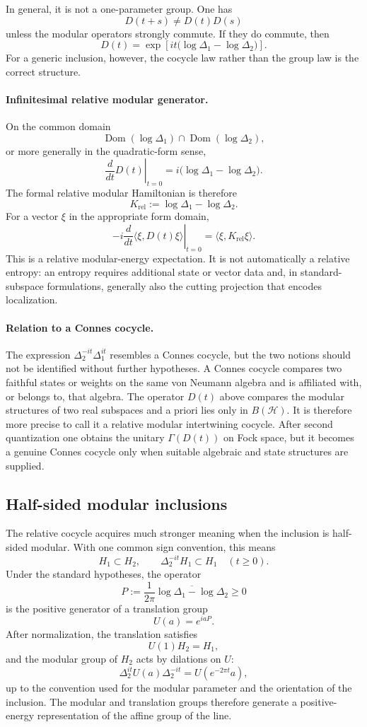 \documentclass[a4paper,11pt]{article}
\theoremstyle{definition}
\newcommand{\cH}{\mathcal{H}}
\newcommand{\Dom}{\operatorname{Dom}}
\begin{document}
In general, it is not a one-parameter group.  One has
\[
 D(t+s)\neq D(t)D(s)
\]
unless the modular operators strongly commute.  If they do commute, then
\[
 D(t)
 =\exp\!\left[it\bigl(\log\Delta_1-\log\Delta_2\bigr)\right].
\]
For a generic inclusion, however, the cocycle law rather than the group
law is the correct structure.

\paragraph{Infinitesimal relative modular generator.}
On the common domain
\[
\Dom(\log\Delta_1)\cap\Dom(\log\Delta_2),
\]
or more generally in the quadratic-form sense,
\[
\boxed{
   \left.\frac{d}{dt}D(t)\right|_{t=0}
   =i\bigl(\log\Delta_1-\log\Delta_2\bigr).
}
\]
The formal relative modular Hamiltonian is therefore
\[
K_{\mathrm{rel}}
   :=\log\Delta_1-\log\Delta_2.
\]
For a vector $\xi$ in the appropriate form domain,
\[
-i\left.\frac{d}{dt}
  \langle\xi,D(t)\xi\rangle\right|_{t=0}
=
\langle\xi,K_{\mathrm{rel}}\xi\rangle.
\]
This is a relative modular-energy expectation.  It is not automatically a
relative entropy: an entropy requires additional state or vector data and,
in standard-subspace formulations, generally also the cutting projection
that encodes localization.

\paragraph{Relation to a Connes cocycle.}
The expression $\Delta_2^{-it}\Delta_1^{it}$ resembles a Connes cocycle,
but the two notions should not be identified without further hypotheses.
A Connes cocycle compares two faithful states or weights on the same von
Neumann algebra and is affiliated with, or belongs to, that algebra.  The
operator $D(t)$ above compares the modular structures of two real
subspaces and a priori lies only in $B(\cH)$.  It is therefore more precise
to call it a relative modular intertwining cocycle.  After second
quantization one obtains the unitary $\Gamma(D(t))$ on Fock space, but it
becomes a genuine Connes cocycle only when suitable algebraic and state
structures are supplied.

\subsection*{Half-sided modular inclusions}

The relative cocycle acquires much stronger meaning when the inclusion is
half-sided modular.  With one common sign convention, this means
\[
H_1\subset H_2,
\qquad
\Delta_2^{-it}H_1\subset H_1
\quad (t\geq 0).
\]
Under the standard hypotheses, the operator
\[
\boxed{
P
   :=\frac{1}{2\pi}
      \overline{\log\Delta_1-\log\Delta_2}
   \geq 0
}
\]
is the positive generator of a translation group
\[
U(a)=e^{iaP}.
\]
After normalization, the translation satisfies
\[
U(1)H_2=H_1,
\]
and the modular group of $H_2$ acts by dilations on $U$:
\[
\Delta_2^{it}U(a)\Delta_2^{-it}
   =U(e^{-2\pi t}a),
\]
up to the convention used for the modular parameter and the orientation
of the inclusion.  The modular and translation groups therefore generate
a positive-energy representation of the affine group of the line.
\end{document}
